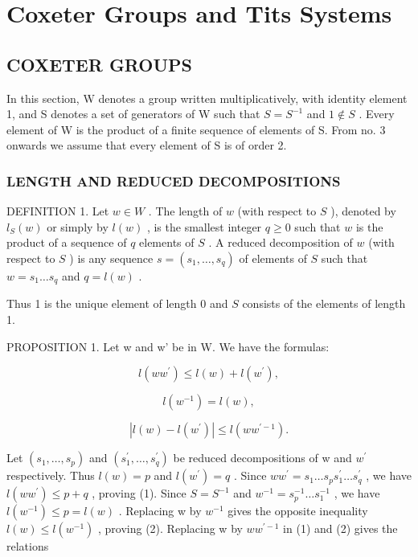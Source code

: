 \chapter{Coxeter Groups and Tits Systems}

\section{COXETER GROUPS}

In this section, W denotes a group written multiplicatively, with identity element 1, and S denotes a set of generators of W such that \(S = S^{-1}\) and \(1 \notin S\) . Every element of W is the product of a finite sequence of elements of S. From no. 3 onwards we assume that every element of S is of order 2.

\subsection{LENGTH AND REDUCED DECOMPOSITIONS}

DEFINITION 1. Let \(w \in W\) . The length of \(w\) (with respect to \(S\) ), denoted by \(l_{S}(w)\) or simply by \(l(w)\) , is the smallest integer \(q \geqslant 0\) such that \(w\) is the product of a sequence of \(q\) elements of \(S\) . A reduced decomposition of \(w\) (with respect to \(S\) ) is any sequence \(s = (s_1, \ldots, s_q)\) of elements of \(S\) such that \(w = s_1 \ldots s_q\) and \(q = l(w)\) .

Thus 1 is the unique element of length 0 and \(S\) consists of the elements of length 1.

PROPOSITION 1. Let w and w' be in W. We have the formulas:

\[
l (w w ^ {\prime}) \leqslant l (w) + l (w ^ {\prime}),\tag{1}
\]

\[
l (w ^ {- 1}) = l (w),\tag{2}
\]

\[
\left| l (w) - l \left(w ^ {\prime}\right) \right| \leqslant l \left(w w ^ {\prime - 1}\right).\tag{3}
\]

Let \((s_{1},\ldots,s_{p})\) and \((s_{1}^{\prime},\ldots,s_{q}^{\prime})\) be reduced decompositions of w and \(w^{\prime}\) respectively. Thus \(l(w)=p\) and \(l(w^{\prime})=q\) . Since \(ww^{\prime}=s_{1}\ldots s_{p}s_{1}^{\prime}\ldots s_{q}^{\prime}\) , we have \(l(ww^{\prime})\leqslant p+q\) , proving (1). Since \(S=S^{-1}\) and \(w^{-1}=s_{p}^{-1}\ldots s_{1}^{-1}\) , we have \(l(w^{-1})\leqslant p=l(w)\) . Replacing w by \(w^{-1}\) gives the opposite inequality \(l(w)\leqslant l(w^{-1})\) , proving (2). Replacing w by \(ww^{\prime-1}\) in (1) and (2) gives the relations

